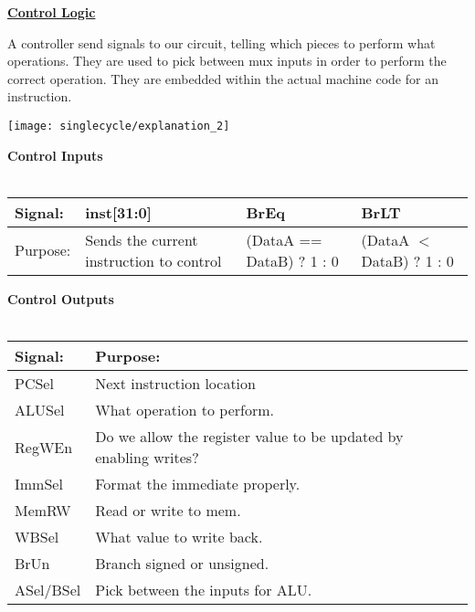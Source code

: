 \begin{blocksection}
\question

\textbf{\underline{Control Logic}}

A controller send signals to our circuit, telling which pieces to perform what operations.  They are used to pick between mux inputs in order to perform the correct operation.  They are embedded within the actual machine code for an instruction.

\texttt{[image: singlecycle/explanation\_2]}

\textbf{Control Inputs}\\\\
\begin{tabular}{ |l|l|l|l| } 
 \hline
 \textbf{Signal:} & \textbf{inst[31:0]} & \textbf{BrEq} & \textbf{BrLT} \\ 
 \hline
 Purpose: & Sends the current instruction to control & (DataA == DataB) ? 1 : 0 & (DataA $<$ DataB) ? 1 : 0 \\ 
 \hline
\end{tabular}

\textbf{Control Outputs}\\\\
\begin{tabular}{ |l|l|l|l|l| } 
 \hline
 \textbf{Signal:} & \textbf{Purpose:} \\
 \hline
 \hline
 PCSel & Next instruction location \\
 \hline
 ALUSel & What operation to perform. \\
 \hline
 RegWEn & Do we allow the register value to be updated by enabling writes? \\
 \hline
 ImmSel & Format the immediate properly.\\ 
 \hline
 MemRW & Read or write to mem. \\
 \hline
 WBSel & What value to write back. \\
 \hline 
 BrUn & Branch signed or unsigned. \\
 \hline 
 ASel/BSel & Pick between the inputs for ALU. \\
 \hline
\end{tabular}

\end{blocksection}